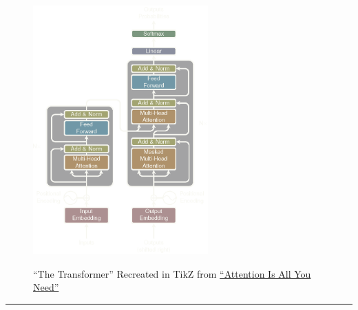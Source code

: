 \documentclass[12pt, oneside]{book}
\newcounter{BoxCounter}
\begin{document}



\newcommand{\titlestandin}{Machine Learning Notes (Book 1)}
\newcommand{\cussubtitle}{``Hands-On Machine Learning with Scikit-Learn, Keras, and TensorFlow''}




\begin{titlepage}
    \begin{center}

        \vspace*{-2cm}
        \begin{figure}[h!]
            \centering
            \includegraphics[width=0.6\textwidth]{images/ML_logo_v3.png}\\
            \caption{``The Transformer'' Recreated in TikZ from \href{https://proceedings.neurips.cc/paper_files/paper/2017/file/3f5ee243547dee91fbd053c1c4a845aa-Paper.pdf}{``Attention Is All You Need''}}
        \end{figure}

        \textcolor{draculapink}{\rule{\textwidth}{1.0pt}}


\end{center}
\end{titlepage}
\end{document}
